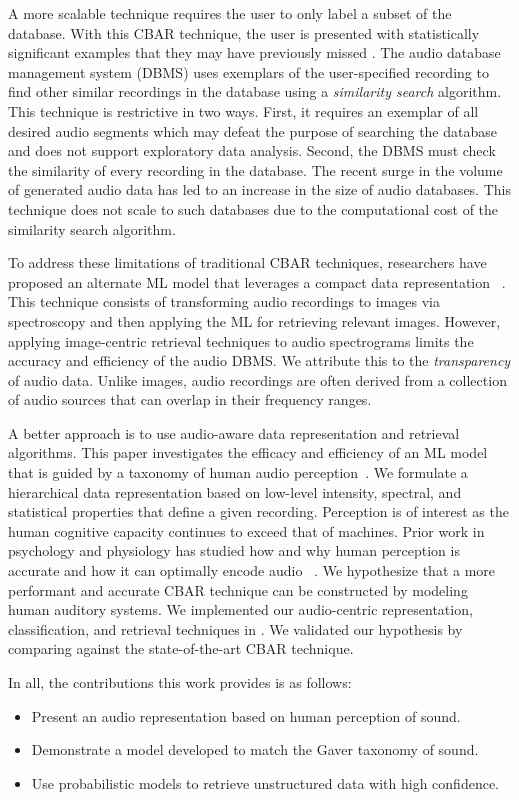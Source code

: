 A more scalable technique requires the user to only label a subset of the
database.
With this CBAR technique, the user is presented with statistically significant
examples that they may have previously missed \cite{Chechik2008}.
The audio database management system (DBMS) uses exemplars of the 
user-specified recording to find other similar recordings in the database
using a \textit{similarity search} algorithm.
This technique is restrictive in two ways.
First, it requires an exemplar of all desired audio segments which may defeat
the purpose of searching the database and does not support exploratory data
analysis. 
Second, the DBMS must check the similarity of every recording in the database.
The recent surge in the volume of generated audio data has led to an increase 
in the size of audio databases. This technique does not scale to such 
databases due to the computational cost of the similarity search algorithm.

To address these limitations of traditional CBAR techniques, researchers have
proposed an alternate ML model that leverages a compact data
representation ~\cite{Chechik2008}. This technique consists of transforming
audio recordings to images via spectroscopy and then applying the ML for
retrieving relevant images.
However, applying image-centric retrieval techniques to audio spectrograms
limits the accuracy and efficiency of the audio DBMS.
We attribute this to the \textit{transparency} of audio data. 
Unlike images, audio recordings are often derived from a collection of audio
sources that can overlap in their frequency ranges.

A better approach is to use audio-aware data representation and retrieval
algorithms. This paper investigates the efficacy and efficiency of an ML 
model that is guided by a taxonomy of human audio perception~\cite{Gaver1993}.
We formulate a hierarchical data representation based on low-level intensity,
spectral, and statistical properties that define a given recording. 
Perception is of interest as the human cognitive capacity continues to exceed
that of machines. Prior work in psychology and physiology has studied 
how and why human perception is accurate and how it can optimally encode audio
~\cite{Gaver1993, Eggermont2001, slaney1993importance, Piazza2013}.
We hypothesize that a more performant and accurate CBAR technique can be
constructed by modeling human auditory systems.
We implemented our audio-centric representation, classification, and retrieval
techniques in \sys. We validated our hypothesis by comparing \sys against 
the state-of-the-art CBAR technique.

In all, the contributions this work provides is as follows:
\begin{itemize}
    \item Present an audio representation based on human perception of sound.
    \item Demonstrate a model developed to match the Gaver taxonomy of sound.
    \item Use probabilistic models to retrieve unstructured data with high confidence.
\end{itemize}